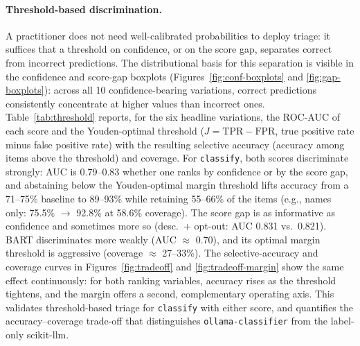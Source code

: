 \documentclass[11pt,a4paper]{article}
\begin{document}
\paragraph{Threshold-based discrimination.}
A practitioner does not need well-calibrated probabilities to deploy triage:
it suffices that a threshold on confidence, or on the score gap, separates
correct from incorrect predictions. The distributional basis for this
separation is visible in the confidence and score-gap boxplots
(Figures~\ref{fig:conf-boxplots} and \ref{fig:gap-boxplots}): across all 10
confidence-bearing variations, correct predictions consistently concentrate at
higher values than incorrect ones. Table~\ref{tab:threshold} reports, for the
six headline variations, the ROC-AUC of each score and the Youden-optimal
threshold ($J=\text{TPR}-\text{FPR}$, true positive rate minus false
positive rate) with the resulting selective accuracy
(accuracy among items above the threshold) and coverage. For
\texttt{classify}, both scores discriminate strongly: AUC is 0.79--0.83
whether one ranks by confidence or by the score gap, and abstaining below the
Youden-optimal margin threshold lifts accuracy from a 71--75\% baseline to
89--93\% while retaining 55--66\% of the items (e.g., names only: 75.5\%
$\to$ 92.8\% at 58.6\% coverage). The score gap is as informative as
confidence and sometimes more so (desc.\ + opt-out: AUC 0.831 vs.\ 0.821).
BART discriminates more weakly (AUC $\approx$ 0.70), and its optimal margin
threshold is aggressive (coverage $\approx$ 27--33\%). The selective-accuracy
and coverage curves in Figures~\ref{fig:tradeoff} and \ref{fig:tradeoff-margin}
show the same effect continuously: for both ranking variables, accuracy rises
as the threshold tightens, and the margin offers a second, complementary
operating axis. This validates threshold-based triage for \texttt{classify}
with either score, and quantifies the accuracy--coverage trade-off that
distinguishes \texttt{ollama-classifier} from the label-only scikit-llm.
\end{document}
